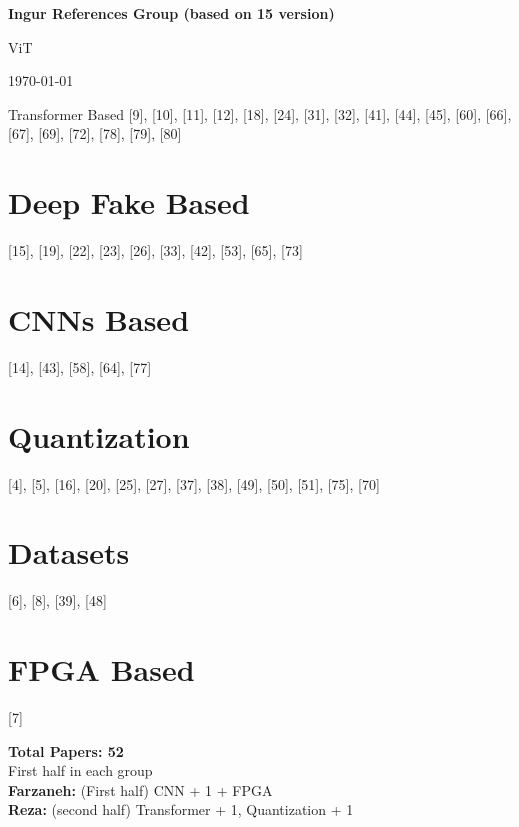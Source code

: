 \documentclass{article}
\newcommand{\maketitletwo}[2][]{\begin{center}
		\Large{\textbf{Ingur References Group \small{(based on 15 version)}}
			
			ViT}
		\vspace{5pt}
		
		\normalsize{\today}
		\vspace{15pt}
		
\end{center}}
\begin{document}
	\maketitletwo[5]
	
	
	\section{Transformer Based}
	[9], [10], [11], [12], [18], [24], [31], [32], [41], [44], [45],
	[60], [66], [67], [69], [72], [78], [79], [80]
	
	
	\section{Deep Fake Based}
	[15], [19], [22], [23], [26], [33], [42], [53], [65], [73]
	
	\section{CNNs Based}
	[14], [43], [58], [64], [77]
	
	\section{Quantization}
	[4], [5], [16], [20], [25], [27], [37], [38], [49], [50], [51], [75], 
	[70]
	
	
	\section{Datasets}
	[6], [8], [39], [48]
	
	
	\section{FPGA Based}
	[7]
	
	\vspace{40pt}
	\centering
	\huge \textbf{Total Papers: 52} \\
	First half in each group \\
	\textbf{Farzaneh:} (First half) CNN + 1 + FPGA \\
	\textbf{Reza:} (second half) Transformer + 1, Quantization + 1 
	
	
\end{document}
